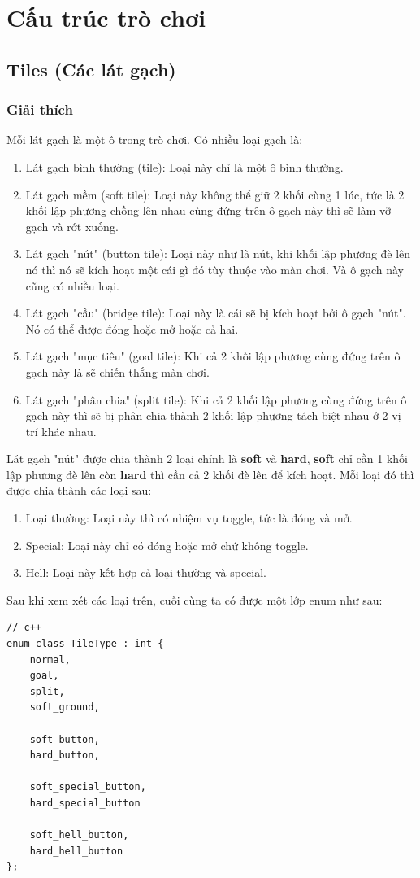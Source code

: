 \documentclass[a4paper, 11pt]{article}
\begin{document}
\section{Cấu trúc trò chơi}
\subsection{Tiles (Các lát gạch)}
\subsubsection{Giải thích}
Mỗi lát gạch là một ô trong trò chơi. Có nhiều loại gạch là:
\begin{enumerate}
	\item Lát gạch bình thường (tile): Loại này chỉ là một ô bình thường.
	\item Lát gạch mềm (soft tile): Loại này không thể giữ 2 khối cùng 1 lúc, tức là 2 khối lập
	      phương chồng lên nhau cùng đứng trên ô gạch này thì sẽ làm vỡ gạch và rớt xuống.
	\item Lát gạch "nút" (button tile): Loại này như là nút, khi khối lập phương đè lên nó thì
	      nó sẽ kích hoạt một cái gì đó tùy thuộc vào màn chơi. Và ô gạch này cũng có nhiều loại.
	\item Lát gạch "cầu" (bridge tile): Loại này là cái sẽ bị kích hoạt bởi ô gạch "nút". Nó có thể
	      được đóng hoặc mở hoặc cả hai.
	\item Lát gạch "mục tiêu" (goal tile): Khi cả 2 khối lập phương cùng đứng trên ô gạch này là
	      sẽ chiến thắng màn chơi.
	\item Lát gạch "phân chia" (split tile): Khi cả 2 khối lập phương cùng đứng trên ô gạch này thì
	      sẽ bị phân chia thành 2 khối lập phương tách biệt nhau ở 2 vị trí khác nhau.
\end{enumerate}
Lát gạch "nút" được chia thành 2 loại chính là \textbf{soft} và \textbf{hard}, \textbf{soft} chỉ cần
1 khối lập phương đè lên còn \textbf{hard} thì cần cả 2 khối đè lên để kích hoạt.
Mỗi loại đó thì được chia thành các loại sau:
\begin{enumerate}
	\item Loại thường: Loại này thì có nhiệm vụ toggle, tức là đóng và mở.
	\item Special: Loại này chỉ có đóng hoặc mở chứ không toggle.
	\item Hell: Loại này kết hợp cả loại thường và special.
\end{enumerate}
Sau khi xem xét các loại trên, cuối cùng ta có được một lớp enum như sau:
\begin{verbatim}
// c++
enum class TileType : int {
    normal,
    goal,
    split,
    soft_ground,

    soft_button,
    hard_button,

    soft_special_button,
    hard_special_button

    soft_hell_button,
    hard_hell_button
};
\end{verbatim}
\end{document}
